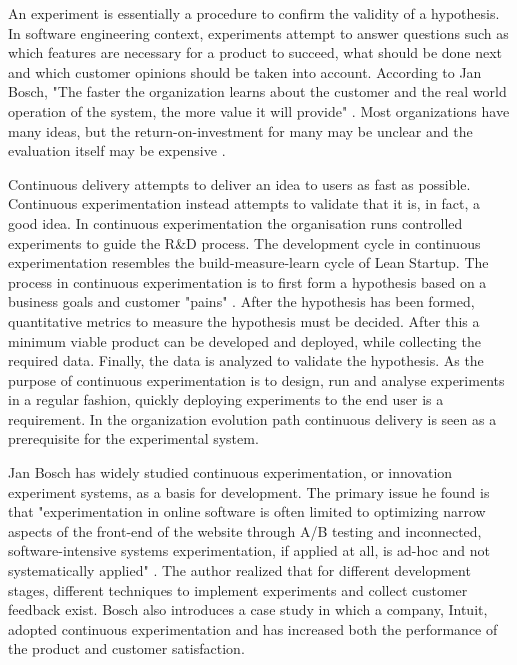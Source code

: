 \documentclass[english]{tktltiki2}
\theoremstyle{definition}
\theoremstyle{remark}
\begin{document}

An experiment is essentially a procedure to confirm the validity of a hypothesis. In software engineering context, experiments attempt to answer questions such as which features are necessary for a product to succeed, what should be done next and which customer opinions should be taken into account. According to Jan Bosch, "The faster the organization learns about the customer and the real world operation of the system, the more value it will provide" \cite{bosch2012building}. Most organizations have many ideas, but the return-on-investment for many may be unclear and the evaluation itself may be expensive \cite{kohavi2007practical}. 

Continuous delivery attempts to deliver an idea to users as fast as possible. Continuous experimentation instead attempts to validate that it is, in fact, a good idea. In continuous experimentation the organisation runs controlled experiments to guide the R\&D process. The development cycle in continuous experimentation resembles the build-measure-learn cycle of Lean Startup. The process in continuous experimentation is to first form a hypothesis based on a business goals and customer "pains" \cite{bosch2012building}. After the hypothesis has been formed, quantitative metrics to measure the hypothesis must be decided. After this a minimum viable product can be developed and deployed, while collecting the required data. Finally, the data is analyzed to validate the hypothesis. As the purpose of continuous experimentation is to design, run and analyse experiments in a regular fashion, quickly deploying experiments to the end user is a requirement. In the organization evolution path \cite{olsson2012climbing} continuous delivery is seen as a prerequisite for the experimental system. 

Jan Bosch has widely studied continuous experimentation, or innovation experiment systems, as a basis for development. The primary issue he found is that "experimentation in online software is often limited to optimizing narrow aspects of the front-end of the website through A/B testing and inconnected, software-intensive systems experimentation, if applied at all, is ad-hoc and not systematically applied" \cite{bosch2012building}. The author realized that for different development stages, different techniques to implement experiments and collect customer feedback exist. Bosch also introduces a case study in which a company, Intuit, adopted continuous experimentation and has increased both the performance of the product and customer satisfaction.
\end{document}
